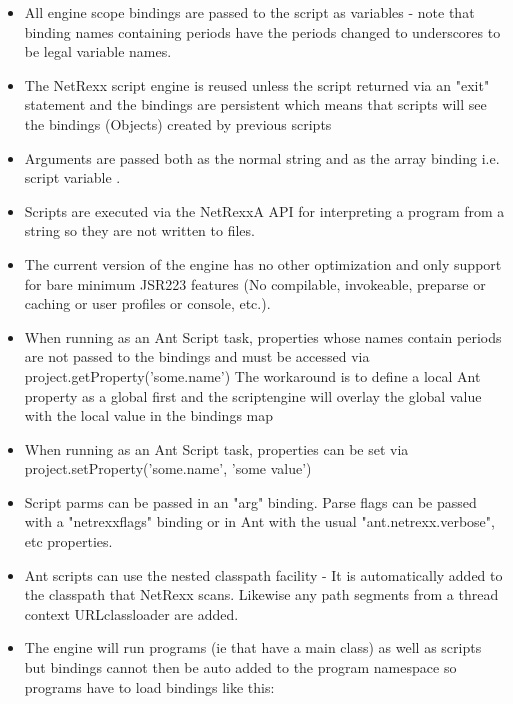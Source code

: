 \begin{itemize}
\item All engine scope bindings are passed to the script as variables - note that binding names containing periods have the periods changed to underscores to be legal variable names.
\item The NetRexx script engine is reused unless the script returned via an "exit" statement and the bindings are persistent which means that scripts will see the bindings (Objects) created by previous scripts
\item Arguments are passed both as the normal  string and as the array binding  i.e. script variable .
\item Scripts are executed via the NetRexxA API for interpreting a program from a string so they are not written to files.
\item The current version of the engine has no other optimization and only support for bare minimum JSR223 features (No compilable, invokeable, preparse or caching or user profiles or console, etc.).
\item When running as an Ant Script task, properties whose names
  contain periods are not passed to the bindings and must be accessed
  via project.getProperty('some.name') The workaround is to define a local Ant property as a global first and the scriptengine will overlay the global value with the local value in the bindings map
\item When running as an Ant Script task, properties can be set via
  project.setProperty('some.name', 'some value')
\item Script parms can be passed in an "arg" binding. Parse flags can be passed with a "netrexxflags" binding or in Ant with the usual "ant.netrexx.verbose", etc properties.
\item Ant scripts can use the nested classpath facility - It is automatically added to the classpath that NetRexx scans. Likewise any path segments from a thread context URLclassloader are added.
\item The engine will run programs (ie that have a main class) as well as scripts but bindings cannot then be auto added to the program namespace so
programs have to load bindings like this: 
\end{itemize}